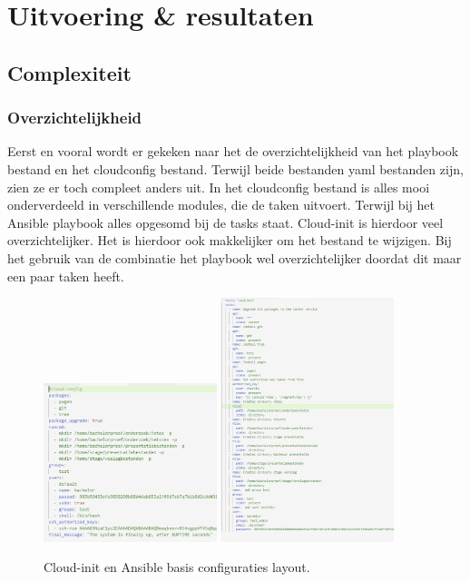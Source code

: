 \section{Uitvoering \& resultaten}
\subsection{Complexiteit}
\subsubsection{Overzichtelijkheid}
Eerst en vooral wordt er gekeken naar het de overzichtelijkheid van het playbook bestand en het cloudconfig bestand. Terwijl beide bestanden yaml bestanden zijn, zien ze er toch compleet anders uit. In het cloudconfig bestand is alles mooi onderverdeeld in verschillende modules, die de taken uitvoert. Terwijl bij het Ansible playbook alles opgesomd bij de tasks staat. Cloud-init is hierdoor veel overzichtelijker. Het is hierdoor ook makkelijker om het bestand te wijzigen. Bij het gebruik van de combinatie het playbook wel overzichtelijker doordat dit maar een paar taken heeft.
\begin{figure}[!htb]
    \centering
    {{\includegraphics[width=0.45\textwidth]{img/basiscloud.png} }}%
    \qquad
    {{\includegraphics[width=0.45\textwidth]{img/basisansible.png} }}%
    \caption{Cloud-init en Ansible basis configuraties layout.}%
    \label{fig:basisconf_layout}%
\end{figure}
